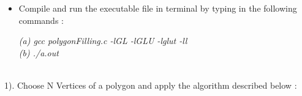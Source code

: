 \begin{itemize}
\vspace{0.5mm}

\item Compile and run the executable file in terminal by typing in the following commands : \\

\vspace{0.5mm} \flushleft

\textit{(a)\hspace{2mm} gcc polygonFilling.c -lGL -lGLU -lglut -ll} \\
\textit{(b)\hspace{2mm} ./a.out}
\vspace*{1\baselineskip}
\end{itemize}

\\

1). Choose N Vertices of a polygon and  apply the algorithm described below :

